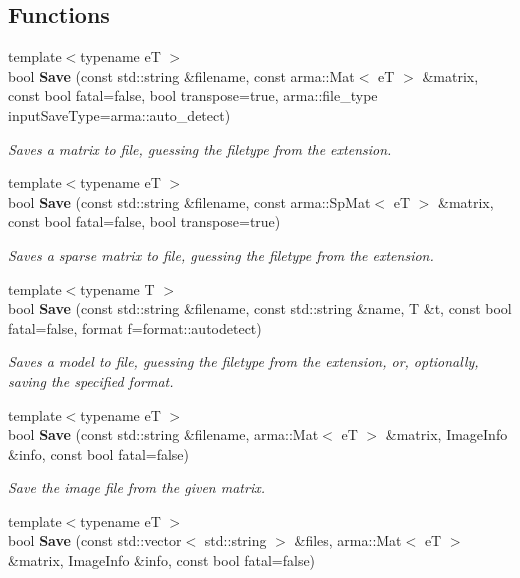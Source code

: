 \subsection*{Functions}
\begin{DoxyCompactItemize}
\item 
{\footnotesize template$<$typename eT $>$ }\\bool \textbf{ Save} (const std\+::string \&filename, const arma\+::\+Mat$<$ eT $>$ \&matrix, const bool fatal=false, bool transpose=true, arma\+::file\+\_\+type input\+Save\+Type=arma\+::auto\+\_\+detect)
\begin{DoxyCompactList}\small\item\em Saves a matrix to file, guessing the filetype from the extension. \end{DoxyCompactList}\item 
{\footnotesize template$<$typename eT $>$ }\\bool \textbf{ Save} (const std\+::string \&filename, const arma\+::\+Sp\+Mat$<$ eT $>$ \&matrix, const bool fatal=false, bool transpose=true)
\begin{DoxyCompactList}\small\item\em Saves a sparse matrix to file, guessing the filetype from the extension. \end{DoxyCompactList}\item 
{\footnotesize template$<$typename T $>$ }\\bool \textbf{ Save} (const std\+::string \&filename, const std\+::string \&name, T \&t, const bool fatal=false, format f=format\+::autodetect)
\begin{DoxyCompactList}\small\item\em Saves a model to file, guessing the filetype from the extension, or, optionally, saving the specified format. \end{DoxyCompactList}\item 
{\footnotesize template$<$typename eT $>$ }\\bool \textbf{ Save} (const std\+::string \&filename, arma\+::\+Mat$<$ eT $>$ \&matrix, Image\+Info \&info, const bool fatal=false)
\begin{DoxyCompactList}\small\item\em Save the image file from the given matrix. \end{DoxyCompactList}\item 
{\footnotesize template$<$typename eT $>$ }\\bool \textbf{ Save} (const std\+::vector$<$ std\+::string $>$ \&files, arma\+::\+Mat$<$ eT $>$ \&matrix, Image\+Info \&info, const bool fatal=false)

\end{DoxyCompactItemize}
